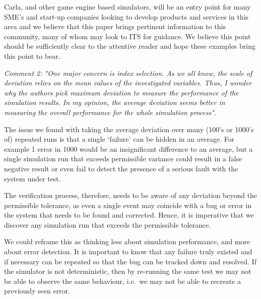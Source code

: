 \documentclass[11pt, a4paper]{letter} %
\begin{document}
\begin{letter}
Carla, and other game engine based simulators, will be an entry point for many SME's and start-up companies looking to develop products and services in this area and we believe that this paper brings pertinent information to this community, many of whom may look to ITS for guidance. We believe this point should be sufficiently clear to the attentive reader and hope these examples bring this point to bear.


\bigskip

\textit{Comment 2: "One major concern is index selection. As we all know, the scale of deviation relies on the mean values of the investigated variables. Thus, I wonder why the authors pick maximum deviation to measure the performance of the simulation results. In my opinion, the average deviation seems better in measuring the overall performance for the whole simulation process"}.

The issue we found with taking the average deviation over many (100's or 1000's of) repeated runs is that a single `failure' can be hidden in an average. For example 1 error in 1000 would be an insignificant difference to an average, but a single simulation run that exceeds permissible variance could result in a false negative result or even fail to detect the presence of a serious fault with the system under test. 

The verification process, therefore, needs to be aware of any deviation beyond the permissible tolerance, as even a single event may coincide with a bug or error in the system that needs to be found and corrected. Hence, it is imperative that we discover any simulation run that exceeds the permissible tolerance. 

We could reframe this as thinking less about simulation performance, and more about error detection. It is important to know that any failure truly existed and if necessary can be repeated so that the bug can be tracked down and resolved. If the simulator is not deterministic, then by re-running the same test we may not be able to observe the same behaviour, i.e.\ we may not be able to recreate a previously seen error.


\end{letter}
\end{document}
